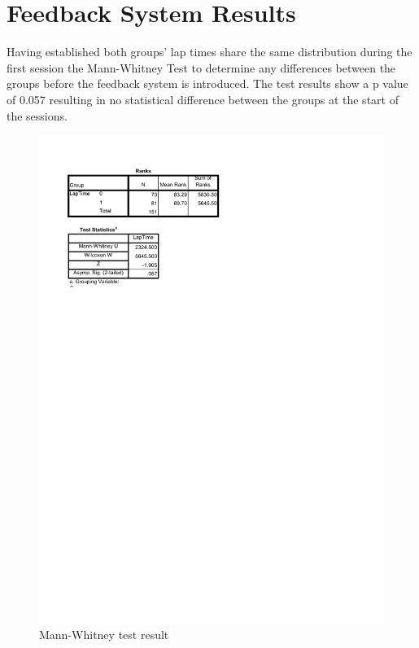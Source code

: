 \section{Feedback System Results}
\label{sec:eval-feedbackSysResults}

Having established both groups' lap times share the same distribution during the first session the Mann-Whitney Test to determine any differences between the groups before the feedback system is introduced. The test results show a p value of 0.057 resulting in no statistical difference between the groups at the start of the sessions.

\begin{figure}[!htb]
	\centering
	\includegraphics[width=\textwidth]{charts/Mann-Whitney.pdf}
	\caption[Mann-Whitney]{Mann-Whitney test result}
	\label{fig:chart-KolmogorowSmimov}
\end{figure}

